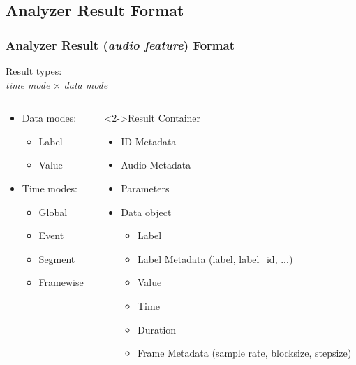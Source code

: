 \documentclass[final, hyperref, table]{beamer}
\begin{document}
\subsection{Analyzer Result Format}
\begin{frame}
  \frametitle{Analyzer Result (\emph{audio feature}) Format}
     \begin{block}{Result types: \\\emph{time mode} $\times$ \emph{data mode}}
       \begin{columns}
         \begin{column}{0.35\linewidth}
           \begin{itemize}
           \item Data modes:
             \begin{itemize}
             \item \alert<2-5>{Label}
             \item \alert<6-9>{Value}
             \end{itemize}
           \item Time modes:
             \begin{itemize}
             \item \alert<2,6>{Global}
             \item \alert<3,7>{Event}
             \item \alert<4,8>{Segment}
             \item \alert<5,9>{Framewise}
             \end{itemize}
           \end{itemize}
         \end{column}
         \begin{column}{0.50\linewidth}\footnotesize
           \begin{exampleblock}<2->{\footnotesize Result Container}\scriptsize
             \begin{itemize}
             \item ID Metadata
             \item Audio Metadata
             \item Parameters
             \item Data object
               \begin{itemize}\scriptsize
               \item<2-5> Label
               \item<2-5> Label Metadata ({\tiny label, label\_id, ...})
               \item<6-9> Value
               \item<3-4,7-8> Time
               \item<4,8> Duration
               \item<5,9> Frame Metadata ({\tiny sample rate, blocksize,
                 stepsize})
               \end{itemize}
           

\end{itemize}
\end{exampleblock}
\end{column}
\end{columns}
\end{block}
\end{frame}
\end{document}

